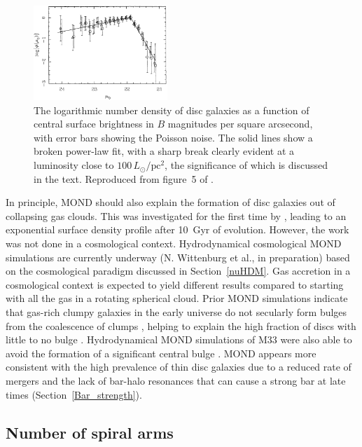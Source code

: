 \documentclass[fleqn,usenatbib,useAMS]{mnras} %
\begin{document}
\begin{figure}
	\centering
	\includegraphics[width=0.45\textwidth]{McGaugh_1996_Figure_5}
	\caption{The logarithmic number density of disc galaxies as a function of central surface brightness in $B$ magnitudes per square arcsecond, with error bars showing the Poisson noise. The solid lines show a broken power-law fit, with a sharp break clearly evident at a luminosity close to $100 \, L_\odot/\text{pc}^2$, the significance of which is discussed in the text. Reproduced from figure~5 of \citet{McGaugh_1996}.}
	\label{McGaugh_1996_Figure_5}
\end{figure}

In principle, MOND should also explain the formation of disc galaxies out of collapsing gas clouds. This was investigated for the first time by \citet{Wittenburg_2020}, leading to an exponential surface density profile after 10~Gyr of evolution. However, the work was not done in a cosmological context. Hydrodynamical cosmological MOND simulations are currently underway (N. Wittenburg et al., in preparation) based on the cosmological paradigm discussed in Section~\ref{nuHDM}. Gas accretion in a cosmological context is expected to yield different results compared to starting with all the gas in a rotating spherical cloud. Prior MOND simulations indicate that gas-rich clumpy galaxies in the early universe do not secularly form bulges from the coalescence of clumps \citep{Combes_2014}, helping to explain the high fraction of discs with little to no bulge \citep{Kormendy_2010}. Hydrodynamical MOND simulations of M33 were also able to avoid the formation of a significant central bulge \citep{Banik_2020_M33}. MOND appears more consistent with the high prevalence of thin disc galaxies due to a reduced rate of mergers and the lack of bar-halo resonances that can cause a strong bar at late times (Section~\ref{Bar_strength}).



\subsection{Number of spiral arms}
\label{n_spiral_arms}
\end{document}
